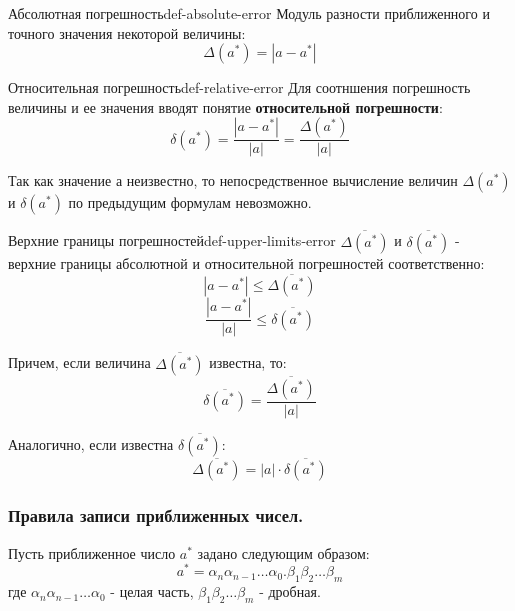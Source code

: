 \documentclass[14pt]{extarticle}
\begin{document}
        \begin{definition}{Абсолютная погрешность}{def-absolute-error}
            Модуль разности приближенного и точного значения некоторой величины:
            $$\Delta(a^{*}) = |a - a^{*}|$$
        \end{definition}

        \begin{definition}{Относительная погрешность}{def-relative-error}
            Для соотншения погрешность величины и ее значения вводят понятие \textbf{относительной погрешности}:
            $$\delta(a^{*}) = \frac{|a - a^{*}|}{|a|} = \frac{\Delta(a^{*})}{|a|}$$
        \end{definition}

        Так как значение $а$ неизвестно, то непосредственное вычисление величин $\Delta(a^{*})$ и $\delta(a^{*})$ по предыдущим формулам невозможно.

        \begin{definition}{Верхние границы погрешностей}{def-upper-limits-error}
            $\overline{\Delta(a^{*})}$ и $\overline{\delta(a^{*})}$ - верхние границы абсолютной и относительной погрешностей соответственно:
            $$|a - a^{*}| \leq \overline{\Delta(a^{*})}$$
            $$\frac{|a - a^{*}|}{|a|} \leq \overline{\delta(a^{*})}$$

            \vspace{\baselineskip}

            Причем, если величина $\overline{\Delta(a^{*})}$ известна, то:
            $$\overline{\delta(a^{*})} = \frac{\overline{\Delta(a^{*})}}{|a|}$$
        
            \vspace{\baselineskip}

            Аналогично, если известна $\overline{\delta(a^{*})}$:
            $$\overline{\Delta(a^{*})} = |a| \cdot \overline{\delta(a^{*})}$$            
        \end{definition}

    \subsubsection{Правила записи приближенных чисел.}
        
        Пусть приближенное число $a^{*}$ задано следующим образом:
        $$a^{*} = \alpha_{n}\alpha_{n-1}\ldots\alpha_{0}.\beta_{1}\beta_{2}\ldots\beta_{m}$$
        где $\alpha_{n}\alpha_{n-1}\ldots\alpha_{0}$ - целая часть, $\beta_{1}\beta_{2}\ldots\beta_{m}$ - дробная.
\end{document}
